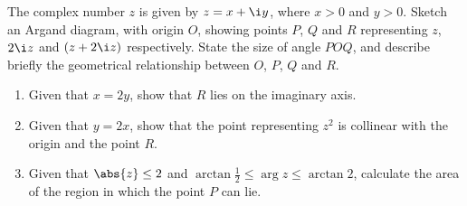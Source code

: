 \begin{problem}
    The complex number $z$ is given by $z = x + \i y$, where $x > 0$ and $y > 0$. Sketch an Argand diagram, with origin $O$, showing points $P$, $Q$ and $R$ representing $z$, $2\i z$ and $(z + 2\i z)$ respectively. State the size of angle $POQ$, and describe briefly the geometrical relationship between $O$, $P$, $Q$ and $R$.

    \begin{enumerate}
        \item Given that $x = 2y$, show that $R$ lies on the imaginary axis.
        \item Given that $y = 2x$, show that the point representing $z^2$ is collinear with the origin and the point $R$.
        \item Given that $\abs{z} \leq 2$ and $\arctan \frac12 \leq \arg z \leq \arctan 2$, calculate the area of the region in which the point $P$ can lie.
    \end{enumerate}
\end{problem}
